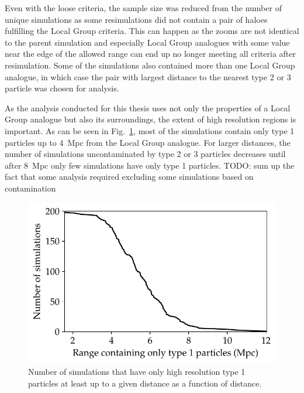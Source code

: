 \documentclass[english, oneside]{HYgradu}
\begin{document}
Even with the loose criteria, the sample size was reduced from the number of unique simulations as some resimulations did not contain a pair of haloes fulfilling the Local Group criteria. This can happen as the zooms are not identical to the parent simulation and especially Local Group analogues with some value near the edge of the allowed range can end up no longer meeting all criteria after resimulation. Some of the simulations also contained more than one Local Group analogue, in which case the pair with largest distance to the nearest type 2 or 3 particle was chosen for analysis.

As the analysis conducted for this thesis uses not only the properties of a Local Group analogue but also its surroundings, the extent of high resolution regions is important. As can be seen in Fig.\ \ref{fig:uncontaminatedDistances}, most of the simulations contain only type 1 particles up to 4~Mpc from the Local Group analogue. For larger distances, the number of simulations uncontaminated by type 2 or 3 particles decreases until after 8~Mpc only few simulations have only type 1 particles. TODO: sum up the fact that some analysis required excluding some simulations based on contamination %


\begin{figure}
    \centering
    \includegraphics{kuvat/uncontaminatedDistances.pdf}
    \caption{Number of simulations that have only high resolution type 1 particles at least up to a given distance as a function of distance.}\label{fig:uncontaminatedDistances}
\end{figure}
\end{document}
